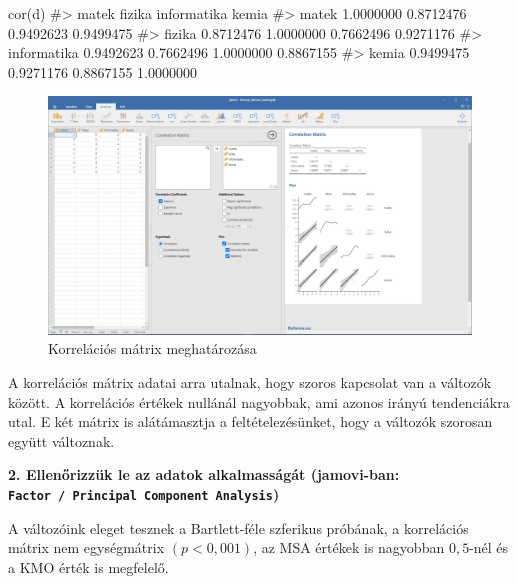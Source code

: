 \documentclass[
  letterpaper,
]{krantz}
\makeatletter
\newenvironment{Shaded}{\begin{snugshade}}{\end{snugshade}}
\newcommand{\CommentTok}[1]{\textcolor[rgb]{0.37,0.37,0.37}{#1}}
\newcommand{\FunctionTok}[1]{\textcolor[rgb]{0.28,0.35,0.67}{#1}}
\newcommand{\NormalTok}[1]{\textcolor[rgb]{0.00,0.23,0.31}{#1}}
\newenvironment{kframe}{%
\medskip{}
\setlength{\fboxsep}{.8em}
 \def\at@end@of@kframe{}%
 \ifinner\ifhmode%
  \def\at@end@of@kframe{\end{minipage}}%
  \begin{minipage}{\columnwidth}%
 \fi\fi%
 \def\FrameCommand##1{\hskip\@totalleftmargin \hskip-\fboxsep
 \colorbox{shadecolor}{##1}\hskip-\fboxsep
     \hskip-\linewidth \hskip-\@totalleftmargin \hskip\columnwidth}%
 \MakeFramed {\advance\hsize-\width
   \@totalleftmargin\z@ \linewidth\hsize
   \@setminipage}}%
 {\par\unskip\endMakeFramed%
 \at@end@of@kframe}
\renewenvironment{Shaded}{\begin{kframe}}{\end{kframe}}
\makeatother
\begin{document}
\begin{Shaded}
\begin{Highlighting}[]
\FunctionTok{cor}\NormalTok{(d)}
\CommentTok{\#\textgreater{}                 matek    fizika informatika     kemia}
\CommentTok{\#\textgreater{} matek       1.0000000 0.8712476   0.9492623 0.9499475}
\CommentTok{\#\textgreater{} fizika      0.8712476 1.0000000   0.7662496 0.9271176}
\CommentTok{\#\textgreater{} informatika 0.9492623 0.7662496   1.0000000 0.8867155}
\CommentTok{\#\textgreater{} kemia       0.9499475 0.9271176   0.8867155 1.0000000}
\end{Highlighting}
\end{Shaded}

\begin{figure}

{\centering \includegraphics{./images/fokomponens_kep_01.jpg}

}

\caption{Korrelációs mátrix meghatározása}

\end{figure}

A korrelációs mátrix adatai arra utalnak, hogy szoros kapcsolat van a
változók között. A korrelációs értékek nullánál nagyobbak, ami azonos
irányú tendenciákra utal. E két mátrix is alátámasztja a
feltételezésünket, hogy a változók szorosan együtt változnak.

\textbf{2. Ellenőrizzük le az adatok alkalmasságát (jamovi-ban:
\texttt{Factor\ /\ Principal\ Component\ Analysis})}

A változóink eleget tesznek a Bartlett-féle szferikus próbának, a
korrelációs mátrix nem egységmátrix \((p<0,001)\), az MSA értékek is
nagyobban \(0,5\)-nél és a KMO érték is megfelelő.
\end{document}
